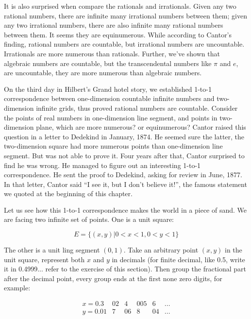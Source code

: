\documentclass{article}
\begin{document}
It is also surprised when compare the rationals and irrationals. Given any two rational numbers, there are infinite many irrational numbers between them; given any two irrational numbers, there are also infinite many rational numbers between them. It seems they are equinumerous. While according to Cantor's finding, rational numbers are countable, but irrational numbers are uncountable. Irrationals are more numerous than rationals. Further, we've shown that algebraic numbers are countable, but the transcendental numbers like $\pi$ and $e$, are uncountable, they are more numerous than algebraic numbers.

On the third day in Hilbert's Grand hotel story, we established 1-to-1 correspondence between one-dimension countable infinite numbers and two-dimension infinite grids, thus proved rational numbers are countable. Consider the points of real numbers in one-dimension line segment, and points in two-dimension plane, which are more numerous? or equinumerous? Cantor raised this question in a letter to Dedekind in January, 1874. He seemed sure the latter, the two-dimension square had more numerous points than one-dimension line segment. But was not able to prove it. Four years after that, Cantor surprised to find he was wrong. He managed to figure out an interesting 1-to-1 correspondence. He sent the proof to Dedekind, asking for review in June, 1877. In that letter, Cantor said ``I see it, but I don't believe it!'', the famous statement we quoted at the beginning of this chapter.

Let us see how this 1-to-1 correspondence makes the world in a piece of sand. We are facing two infinite set of points. One is a unit square:

\[
E = \{ (x, y) | 0 < x < 1, 0 < y < 1\}
\]

The other is a unit ling segment $(0, 1)$. Take an arbitrary point $(x, y)$ in the unit square, represent both $x$ and $y$ in decimals (for finite decimal, like 0.5, write it in 0.4999... refer to the exercise of this section). Then group the fractional part after the decimal point, every group ends at the first none zero digits, for example:

\[
\begin{array}{lcccccc}
x = 0.3 & 02 & 4 & 005 & 6 & ... \\
y = 0.01 & 7 & 06 & 8 & 04 & ... \\
\end{array}
\]
\end{document}
